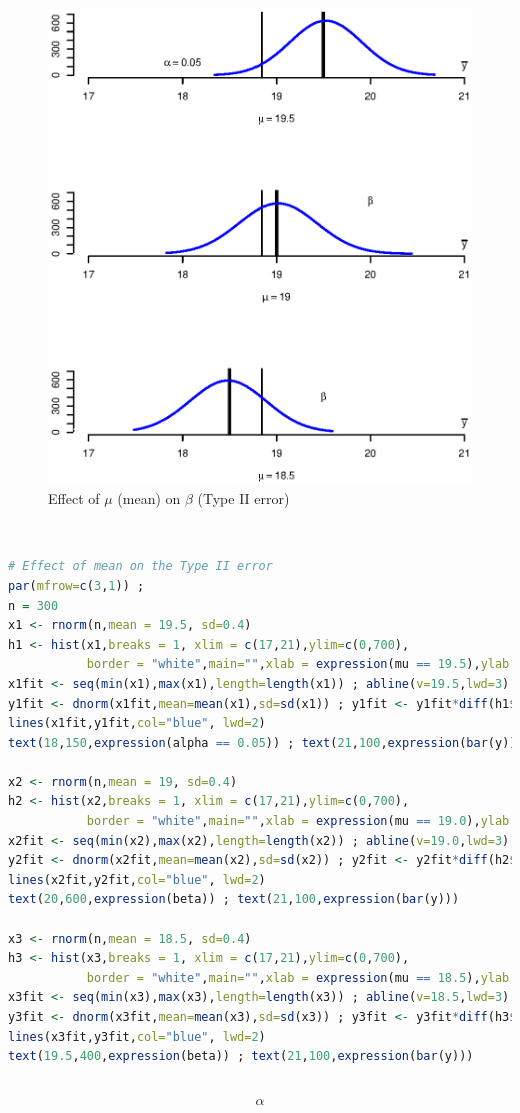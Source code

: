 \documentclass{WileySev}
\begin{document}
\begin{figure}
  \includegraphics[width=0.8\linewidth]{Ch2_beta_dist.eps}
  \centering
  \caption{Effect of $\mu$ (mean) on $\beta$ (Type II error)}
  \label{fig:ch2_beta_dist}
\end{figure}
\
\begin{lstlisting}[language=R]
# Effect of mean on the Type II error
par(mfrow=c(3,1)) ; 
n = 300
x1 <- rnorm(n,mean = 19.5, sd=0.4)
h1 <- hist(x1,breaks = 1, xlim = c(17,21),ylim=c(0,700),
           border = "white",main="",xlab = expression(mu == 19.5),ylab = "") 
x1fit <- seq(min(x1),max(x1),length=length(x1)) ; abline(v=19.5,lwd=3) ; abline(v=18.842)
y1fit <- dnorm(x1fit,mean=mean(x1),sd=sd(x1)) ; y1fit <- y1fit*diff(h1$mids[1:2])*n
lines(x1fit,y1fit,col="blue", lwd=2)
text(18,150,expression(alpha == 0.05)) ; text(21,100,expression(bar(y)))

x2 <- rnorm(n,mean = 19, sd=0.4)
h2 <- hist(x2,breaks = 1, xlim = c(17,21),ylim=c(0,700),
           border = "white",main="",xlab = expression(mu == 19.0),ylab = "") 
x2fit <- seq(min(x2),max(x2),length=length(x2)) ; abline(v=19.0,lwd=3) ; abline(v=18.842)
y2fit <- dnorm(x2fit,mean=mean(x2),sd=sd(x2)) ; y2fit <- y2fit*diff(h2$mids[1:2])*n
lines(x2fit,y2fit,col="blue", lwd=2)
text(20,600,expression(beta)) ; text(21,100,expression(bar(y)))

x3 <- rnorm(n,mean = 18.5, sd=0.4)
h3 <- hist(x3,breaks = 1, xlim = c(17,21),ylim=c(0,700),
           border = "white",main="",xlab = expression(mu == 18.5),ylab = "") 
x3fit <- seq(min(x3),max(x3),length=length(x3)) ; abline(v=18.5,lwd=3) ; abline(v=18.842)
y3fit <- dnorm(x3fit,mean=mean(x3),sd=sd(x3)) ; y3fit <- y3fit*diff(h3$mids[1:2])*n
lines(x3fit,y3fit,col="blue", lwd=2)
text(19.5,400,expression(beta)) ; text(21,100,expression(bar(y)))
\end{lstlisting}
\
\begin{equation}
\alpha
\end{equation}
\end{document}
